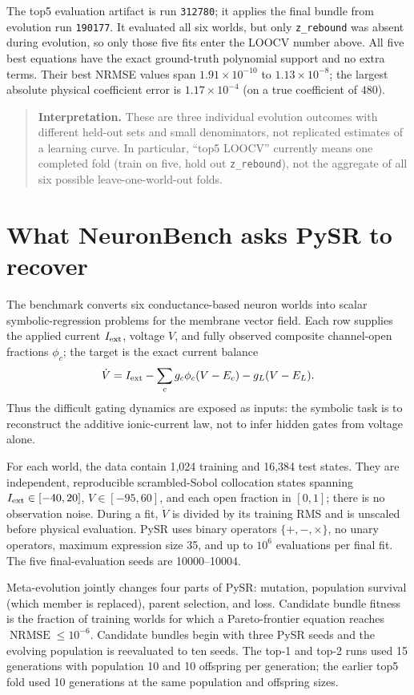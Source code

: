 \documentclass[10pt]{article}
\newcommand{\nrmse}{\operatorname{NRMSE}}
\newcommand{\code}[1]{\nolinkurl{#1}}
\begin{document}
The top5 evaluation artifact is run \code{312780}; it applies the final bundle from evolution
run \code{190177}.  It evaluated all six worlds, but only \code{z_rebound} was absent during
evolution, so only those five fits enter the LOOCV number above.  All five best equations have
the exact ground-truth polynomial support and no extra terms. Their best NRMSE values span
$1.91\times10^{-10}$ to $1.13\times10^{-8}$; the largest absolute physical coefficient error is
$1.17\times10^{-4}$ (on a true coefficient of $480$).

\begin{quote}
\textbf{Interpretation.} These are three individual evolution outcomes with different held-out
sets and small denominators, not replicated estimates of a learning curve.  In particular,
``top5 LOOCV'' currently means one completed fold (train on five, hold out \code{z_rebound}),
not the aggregate of all six possible leave-one-world-out folds.
\end{quote}

\section*{What NeuronBench asks PySR to recover}

The benchmark converts six conductance-based neuron worlds into scalar symbolic-regression
problems for the membrane vector field.  Each row supplies the applied current $I_{\rm ext}$,
voltage $V$, and fully observed composite channel-open fractions $\phi_c$; the target is the
exact current balance
\[
  \dot V = I_{\rm ext}-\sum_c g_c\phi_c(V-E_c)-g_L(V-E_L).
\]
Thus the difficult gating dynamics are exposed as inputs: the symbolic task is to reconstruct
the additive ionic-current law, not to infer hidden gates from voltage alone.

For each world, the data contain 1,024 training and 16,384 test states.  They are independent,
reproducible scrambled-Sobol collocation states spanning $I_{\rm ext}\in[-40,20]$,
$V\in[-95,60]$, and each open fraction in $[0,1]$; there is no observation noise.  During a
fit, $\dot V$ is divided by its training RMS and is unscaled before physical evaluation.  PySR
uses binary operators $\{+,-,\times\}$, no unary operators, maximum expression size 35, and up
to $10^6$ evaluations per final fit.  The five final-evaluation seeds are 10000--10004.

Meta-evolution jointly changes four parts of PySR: mutation, population survival (which member
is replaced), parent selection, and loss. Candidate bundle fitness is the fraction of training
worlds for which a Pareto-frontier equation reaches $\nrmse\le10^{-6}$.  Candidate bundles begin
with three PySR seeds and the evolving population is reevaluated to ten seeds.  The top-1 and
top-2 runs used 15 generations with population 10 and 10 offspring per generation; the earlier
top5 fold used 10 generations at the same population and offspring sizes.
\end{document}
